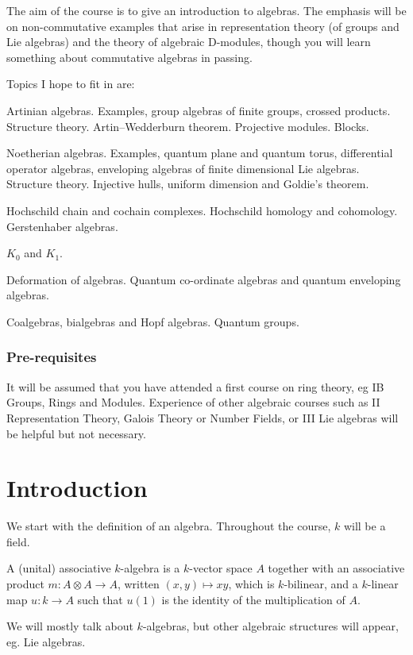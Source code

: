 \documentclass[a4paper]{article}
\begin{document}
\maketitle
{\small
\setlength{\parindent}{0em}
\setlength{\parskip}{1em}
The aim of the course is to give an introduction to algebras. The emphasis will be on non-commutative examples that arise in representation theory (of groups and Lie algebras) and the theory of algebraic D-modules, though you will learn something about commutative algebras in passing.

Topics I hope to fit in are:

Artinian algebras. Examples, group algebras of finite groups, crossed products. Structure theory. Artin--Wedderburn theorem. Projective modules. Blocks.

Noetherian algebras. Examples, quantum plane and quantum torus, differential operator algebras, enveloping algebras of finite dimensional Lie algebras. Structure theory. Injective hulls, uniform dimension and Goldie's theorem.

Hochschild chain and cochain complexes. Hochschild homology and cohomology. Gerstenhaber algebras.

$K_0$ and $K_1$.

Deformation of algebras. Quantum co-ordinate algebras and quantum enveloping algebras.

Coalgebras, bialgebras and Hopf algebras. Quantum groups.

\subsubsection*{Pre-requisites}
It will be assumed that you have attended a first course on ring theory, eg IB Groups, Rings and Modules. Experience of other algebraic courses such as II Representation Theory, Galois Theory or Number Fields, or III Lie algebras will be helpful but not necessary.
}
\tableofcontents

\setcounter{section}{-1}
\section{Introduction}
We start with the definition of an algebra. Throughout the course, $k$ will be a field.
\begin{defi}[$k$-algebra]
  A (unital) associative $k$-algebra is a $k$-vector space $A$ together with an associative product $m: A \otimes A \to A$, written $(x, y) \mapsto xy$, which is $k$-bilinear, and a $k$-linear map $u: k \to A$ such that $u(1)$ is the identity of the multiplication of $A$.
\end{defi}
We will mostly talk about $k$-algebras, but other algebraic structures will appear, eg. Lie algebras.
\end{document}
